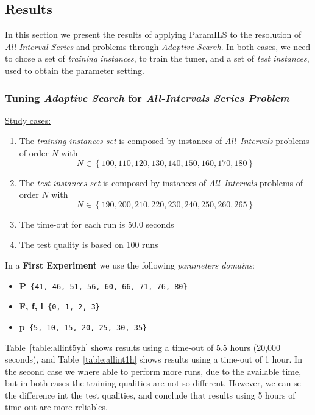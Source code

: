 \subsection{Results}

In this section we present the results of applying {\sc ParamILS} to the resolution of {\it All-Interval Series} and \carr{} problems through {\it Adaptive Search}. In both cases, we need to chose a set of {\it training instances}, to train the tuner, and a set of {\it test instances}, used to obtain the parameter setting. 

\subsubsection{ Tuning {\it Adaptive Search} for  {\it All-Intervals Series Problem}}

\underline{Study cases:}
\begin{enumerate}
	\item The {\it training instances set} is composed by instances of {\it All--Intervals} problems of order $N$ with $$N \in \left\{100, 110, 120, 130, 140, 150, 160, 170, 180\right\}$$
	\item The {\it test instances set} is composed by instances of {\it All--Intervals} problems of order $N$ with $$N \in \left\{190, 200, 210, 220, 230, 240, 250, 260, 265\right\}$$
	\item The time-out for each run is 50.0 seconds
	\item The test quality is based on 100 runs
\end{enumerate}

In a {\bf First Experiment} we use the following {\it parameters domains}:
\begin{itemize}[itemsep=0.2mm]
	\item {\bf P}\texttt{ \{41, 46, 51, 56, 60, 66, 71, 76, 80\}}
	\item {\bf F, f, l}\texttt{ \{0, 1, 2, 3\}}
	\item {\bf p}\texttt{ \{5, 10, 15, 20, 25, 30, 35\}}
\end{itemize}

Table~\ref{table:allint5yh} shows results using a time-out of 5.5 hours (20,000 seconds), and Table~\ref{table:allint1h} shows results using a time-out of 1 hour. In the second case we where able to perform more runs, due to the available time, but in both cases the training qualities are not so different. However, we can se the difference int the test qualities, and conclude that results using 5 hours of time-out are more reliables. 

